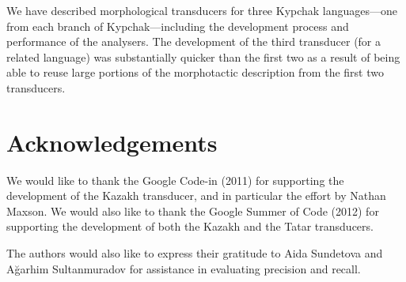\documentclass[a4paper,11pt,twocolumn]{article}
\begin{document}
We have described morphological transducers for three Kypchak languages---one from each branch of Kypchak---including the development process and performance of the analysers. The development of the third transducer (for a related language) was substantially quicker than the first two as a result of being able to reuse large portions of the morphotactic description from the first two transducers.

\section*{Acknowledgements}

We would like to thank the Google Code-in (2011) for supporting the development 
of the Kazakh transducer, and in particular the effort by Nathan Maxson. We 
would also like to thank the Google Summer of Code (2012) for supporting the 
development of both the Kazakh and the Tatar transducers. 

The authors would also like to express their gratitude to Aida Sundetova and Ağarhim Sultanmuradov
for assistance in evaluating precision and recall.




\appendix 
\end{document}
